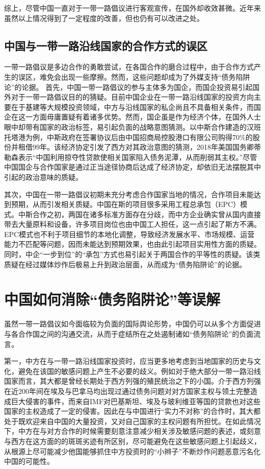 \documentclass[a4paper,UTF8]{article}
\begin{document}
			综上，尽管中国一直对于一带一路倡议进行客观宣传，在国外却收效甚微。近年来虽然以上情况得到了一定程度的改善，但也仍有可以改进之处。
		
		\subsection{中国与一带一路沿线国家的合作方式的误区}
			一带一路倡议是多边合作的勇敢尝试，在各国合作的磨合过程中，由于合作方式产生的误区，难免会出现一些摩擦。然而，这些问题却成为了外媒支持“债务陷阱论”的论据。
			首先，中国一带一路倡议的参与主体多为国企，而国企投资易引起国外对于一带一路倡议目的的猜疑。目前中国企业在一带一路沿线国家的投资方向主要在于基建等大规模投资领域，中方与沿线国家的私企尚且不具备相关条件，而国企在这一方面毋庸置疑有着诸多优势。然而，国企虽是作为经济个体，在国外人士眼中却带有国家的政治标签，易引起负面的战略意图猜测。以中斯合作建造的汉班托塔港为例，中斯政府在签署协议后由中国招商局控股港口有限公司购得70\%的股份并租借99年。该经济协定引发了西方对其政治意图的猜测，2018年美国国务卿蒂勒森表示“中国利用掠夺性贷款使相关国家陷入债务泥潭，从而削弱其主权。”尽管中国国企与合作国家是通过正当途径协商后达成了经济协定，却依旧无法摆脱其中引起的政治意味的质疑。
			
			其次，中国在一带一路倡议初期未充分考虑合作国家当地的情况，合作项目未能达到预期，从而引发相关质疑。中国在斯的项目很多采用工程总承包（EPC）模式。中斯合作之初，两国在诸多标准方面存在分歧，而中方企业确实曾从国内直接带去大量原料和设备，许多项目岗位也由中国工人担任，这一点引起了斯方不满。EPC模式也不利于项目细节的本地化调整，导致经济发展水平、市场规模、运营能力不匹配等问题，因而未能达到预期效果，也由此引起项目实用性方面的质疑。同时，中企“一步到位”的“承包”方式也易引起关于两国合作的平等性的质疑。该类质疑在经过媒体炒作后极易上升到政治层面，从而成为“债务陷阱论”的论据。
		
	\section{中国如何消除“债务陷阱论”等误解}
		虽然一带一路倡议如今面临较为负面的国际舆论形势，中国仍可以从多个方面促进与各合作国之间的沟通交流，从而于症结所在之处遏制诸如“债务陷阱论”的负面流言。
		
		第一，中方在与一带一路沿线国家投资时，应当更多地考虑到当地国家的历史与文化，避免在该国的敏感问题上产生不必要的歧义。例如对于绝大部分一带一路沿线国家而言，其大都是曾经长期处于西方列强的殖民统治之下的小国。介于西方列强在近200年间在埃及与巴拿马均出现过通过债务问题对对方国家主权与领土完整造成巨大侵害的事件，而来自IMF对巴基斯坦、埃及与玻利维亚等国的贷款也对这些国家的主权造成了一定的侵害。因此在与中国进行“实力不对称”的合作时，其大都处于既欢迎来自中国的大量投资，又对自己国家的主权问题有所担忧。在如此情况下，中方在与对方合作的时候需要刻意注意减少相关涉及敏感问题的表述，或刻意与西方在这方面的的斑斑劣迹有所区别，尽可能避免在这些敏感问题上引起歧义，从根源上尽可能减少他国能够抓住中方投资时的“小辫子”不断炒作问题恶意污名化中国的可能性。
		
\end{document}
